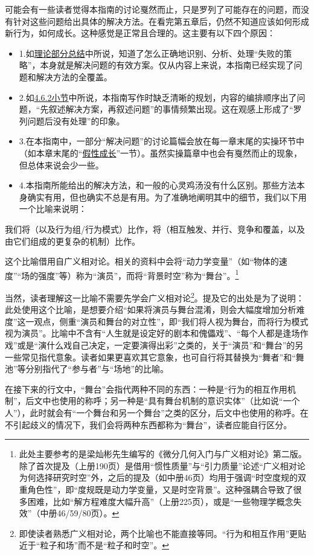 可能会有一些读者觉得本指南的讨论戛然而止，只是罗列了可能存在的问题，而没有针对这些问题给出具体的解决方法。在看完第五章后，仍然不知道应该如何形成新行为，如何成长。这种感觉是正常且合理的。这主要有以下四个原因：\vspace{-0.25em}
\begin{itemize}
\item 1.如\hyperref[para:只写失败]{理论部分总结}中所说，知道了怎么正确地识别、分析、处理“失败的策略”，本身就是解决问题的有效方案。仅从内容上来说，本指南已经实现了问题和解决方法的全覆盖。\vspace{-0.5em}
\item 2.如\hyperref[para:想到哪写到哪]{4.6.2小节}中所说，本指南写作时缺乏清晰的规划，内容的编排顺序出了问题，“先叙述解决方案，再叙述问题”的事情频繁出现。这在观感上形成了“罗列问题后没有处理”的印象。\vspace{-0.5em}
\item 3.在本指南中，一部分“解决问题”的讨论篇幅会放在每一章末尾的实操环节中（如本章末尾的“\hyperref[sec:假性成长]{假性成长}”一节）。虽然实操篇章中也会有戛然而止的现象，但总体来说会少一些。\vspace{-0.5em}
\item 4.本指南所能给出的解决方法，和一般的心灵鸡汤没有什么区别。那些方法本身确实有用，但也确实不总是有用。为了准确地阐明其中的细节，我们以下用一个比喻来说明：\vspace{-0.25em}
\end{itemize}
我们将（以及行为组/行为模式）比作，将（相互触发、并行、竞争和覆盖，以及由它们组成的更复杂的机制）比作。
\begin{explain}
    这个比喻借用自广义相对论。相关的资料中会将“动力学变量”（如“物体的速度”“场的强度”等）称为“演员”，而将“背景时空”称为“舞台”。\footnote{此处主要参考的是梁灿彬先生编写的《微分几何入门与广义相对论》第二版。除了首次提及（上册190页）是借用“惯性质量”与“引力质量”论述“广义相对论为何选择研究时空”外，之后的提及（如中册46页）均用于强调“时空度规的双重角色性”，即“度规既是动力学变量，又是时空背景”。这种强耦合导致了很多困难，比如“解方程难度大幅升高”（上册225页），或是“一些物理学概念失效”（中册46/59/80页）。}
    
    当然，读者理解这一比喻不需要先学会广义相对论\footnote{即使读者熟悉广义相对论，两个比喻也不能直接等同。“行为和相互作用”更贴近于“粒子和场”而不是“粒子和时空”。}。提及它的出处是为了说明：此处使用这个比喻，是想要介绍“如果将演员与舞台混淆，则会大幅度增加分析难度”这一观点，侧重“演员和舞台的对立性”，即“我们将人视为舞台，而将行为模式视为演员”。比喻中不含有“人生就是设定好的剧本和傀儡戏”、“每个人都是逢场作戏”或是“演什么戏自己决定，一定要演得出彩”之类的，关于“演员”和“舞台”的另一些常见指代意象。读者如果更喜欢其它意象，也可自行将其替换为“舞者”和“舞池”等分别指代了“参与者”与“场地”的比喻。

    在接下来的行文中，“舞台”会指代两种不同的东西：一种是“行为的相互作用机制”，后文中也使用的称呼；另一种是“具有舞台机制的意识实体”（比如说“一个人”），此时就会有“一个舞台和另一个舞台”之类的区分，后文中也使用的称呼。在不引起歧义的情况下，我们会将两种东西都称为“舞台”，读者应能自行区分。
\end{explain}
